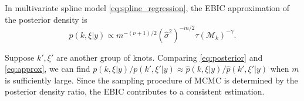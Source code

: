 \begin{lemma}
    In multivariate spline model \eqref{eq:spline_regression}, the EBIC approximation of the posterior density is
    \begin{equation}
        \label{eq:approx}
        \hat{p}(k,\xi|y)\propto m^{-(\nu+1)/2} (\hat{\sigma}^2)^{-m/2} \tau(\mathcal{M}_k)^{-\gamma}.
    \end{equation}
\end{lemma}
Suppose $k',\xi'$ are another group of knots. Comparing \eqref{eq:posterior} and \eqref{eq:approx}, we can find $p(k,\xi|y)/p(k',\xi'|y)\approx \hat{p}(k,\xi|y)/\hat{p}(k',\xi'|y)$ when $m$ is sufficiently large. Since the sampling procedure of MCMC is determined by the posterior density ratio, the EBIC contributes to a consistent estimation.